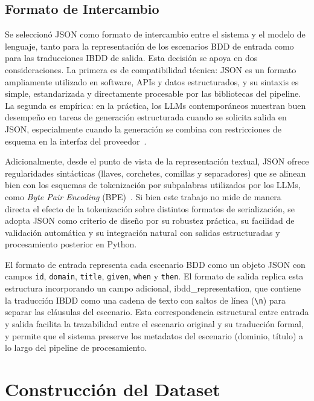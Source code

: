 \subsection{Formato de Intercambio}
\label{sec:formato-json}

Se seleccionó JSON como formato de intercambio entre el sistema y el modelo de lenguaje, tanto para la representación de los escenarios BDD de entrada como para las traducciones IBDD de salida. Esta decisión se apoya en dos consideraciones. La primera es de compatibilidad técnica: JSON es un formato ampliamente utilizado en software, APIs y datos estructurados, y su sintaxis es simple, estandarizada y directamente procesable por las bibliotecas del pipeline. La segunda es empírica: en la práctica, los LLMs contemporáneos muestran buen desempeño en tareas de generación estructurada cuando se solicita salida en JSON, especialmente cuando la generación se combina con restricciones de esquema en la interfaz del proveedor~\cite{openai2024structured}.

Adicionalmente, desde el punto de vista de la representación textual, JSON ofrece regularidades sintácticas (llaves, corchetes, comillas y separadores) que se alinean bien con los esquemas de tokenización por subpalabras utilizados por los LLMs, como \textit{Byte Pair Encoding} (BPE)~\cite{sennrich2016bpe}. Si bien este trabajo no mide de manera directa el efecto de la tokenización sobre distintos formatos de serialización, se adopta JSON como criterio de diseño por su robustez práctica, su facilidad de validación automática y su integración natural con salidas estructuradas y procesamiento posterior en Python.

El formato de entrada representa cada escenario BDD como un objeto JSON con campos \texttt{id}, \texttt{domain}, \texttt{title}, \texttt{given}, \texttt{when} y \texttt{then}. El formato de salida replica esta estructura incorporando un campo adicional, ibdd\_representation, que contiene la traducción IBDD como una cadena de texto con saltos de línea (\verb|\n|) para separar las cláusulas del escenario. Esta correspondencia estructural entre entrada y salida facilita la trazabilidad entre el escenario original y su traducción formal, y permite que el sistema preserve los metadatos del escenario (dominio, título) a lo largo del pipeline de procesamiento.

\section{Construcción del Dataset}
\label{sec:dataset}

